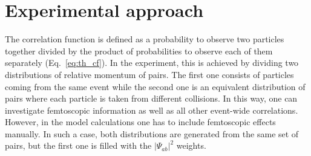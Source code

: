   \section{Experimental approach}
  \label{sec:exp-approach}
    The correlation function is defined as a probability to observe two particles together divided by the product of probabilities to observe each of them separately (Eq.~\ref{eq:th_cf}). 
    In the experiment, this is achieved by dividing two distributions of relative momentum of pairs.
    The first one consists of particles coming from the same event while the second one is an equivalent distribution of pairs where each particle is taken from different collisions.
    In this way, one can investigate femtoscopic information as well as all other event-wide correlations.
    However, in the model calculations one has to include femtoscopic effects manually.
    In such a case, both distributions are generated from the same set of pairs, but the first one is filled with the $|\Psi_{ab}|^2$ weights.

